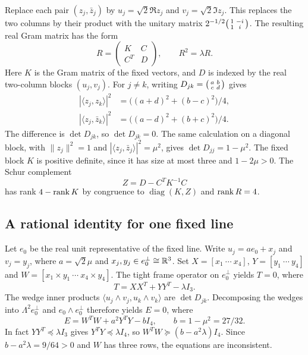 Replace each pair $(z_j,\bar z_j)$ by $u_j=\sqrt2\Re z_j$ and $v_j=\sqrt2\Im z_j$. This replaces the two columns by their product with the unitary matrix $2^{-1/2}\begin{psmallmatrix}1&-i\\1&i\end{psmallmatrix}$. The resulting real Gram matrix has the form
\[
 R=\begin{pmatrix}K&C\\ C^T&D\end{pmatrix},\qquad R^2=\lambda R.
\]
Here $K$ is the Gram matrix of the fixed vectors, and $D$ is indexed by the real two-column blocks $(u_j,v_j)$. For $j\ne k$, writing $D_{jk}=\begin{psmallmatrix}a&b\\c&d\end{psmallmatrix}$ gives
\begin{align*}
 |\langle z_j,z_k\rangle|^2 &= \bigl((a+d)^2+(b-c)^2\bigr)/4,\\
 |\langle z_j,\bar z_k\rangle|^2 &= \bigl((a-d)^2+(b+c)^2\bigr)/4.
\end{align*}
The difference is $\det D_{jk}$, so $\det D_{jk}=0$. The same calculation on a diagonal block, with $\|z_j\|^2=1$ and $|\langle z_j,\bar z_j\rangle|^2=\mu^2$, gives $\det D_{jj}=1-\mu^2$. The fixed block $K$ is positive definite, since it has size at most three and $1-2\mu>0$. The Schur complement
\begin{equation}\label{eq:schur}
 Z=D-C^T K^{-1} C
\end{equation}
has rank $4-\operatorname{rank} K$ by congruence to $\operatorname{diag}(K,Z)$ and $\operatorname{rank} R=4$.

\subsection{A rational identity for one fixed line}

Let $e_0$ be the real unit representative of the fixed line. Write $u_j=a e_0+x_j$ and $v_j=y_j$, where $a=\sqrt2\mu$ and $x_j,y_j\in e_0^\perp\cong\mathbb R^3$. Set $X=[x_1\ \cdots\ x_4]$, $Y=[y_1\ \cdots\ y_4]$ and $W=[x_1\times y_1\ \cdots\ x_4\times y_4]$. The tight frame operator on $e_0^\perp$ yields $T=0$, where
\[
 T=XX^T+YY^T-\lambda I_3.
\]
The wedge inner products $\langle u_j\wedge v_j,u_k\wedge v_k\rangle$ are $\det D_{jk}$. Decomposing the wedges into $\Lambda^2 e_0^\perp$ and $e_0\wedge e_0^\perp$ therefore yields $E=0$, where
\[
 E=W^TW+a^2Y^TY-bI_4,\qquad b=1-\mu^2=27/32.
\]
In fact $YY^T\preceq\lambda I_3$ gives $Y^TY\preceq\lambda I_4$, so $W^TW\succeq(b-a^2\lambda)I_4$. Since $b-a^2\lambda=9/64>0$ and $W$ has three rows, the equations are inconsistent.

